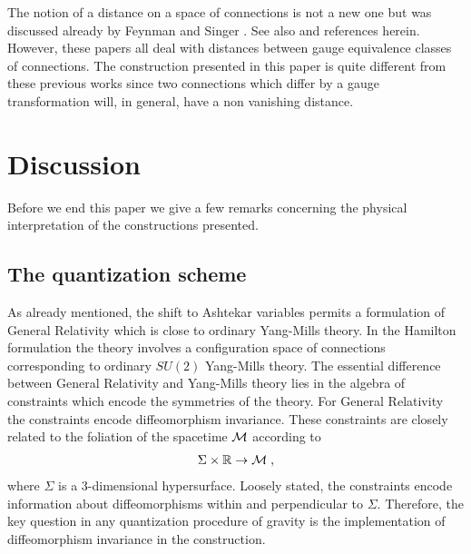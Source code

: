 \documentclass[12pt]{article}
\newcommand{\ba}{\begin{eqnarray}}
\newcommand{\ea}{\end{eqnarray}}
\def\cm{{\cal M}}
\begin{document}
The notion of a distance on a space of connections is not a new one but was discussed already by Feynman \cite{Feynman:1981ss} and Singer \cite{Singer:1981xw}. See also \cite{Orland:1996hm} and references herein. However, these papers all deal with distances between gauge equivalence classes of connections. The construction presented in this paper is quite different from these previous works since two connections which differ by a gauge transformation will, in general, have a non vanishing distance. 


















\section{Discussion}
\label{DISCu}




Before we end this paper we give a few remarks concerning the physical interpretation of the constructions presented. 










\subsection{The quantization scheme}
\label{link2}





 As already mentioned, the shift to Ashtekar variables permits a formulation of General Relativity which is close to ordinary Yang-Mills theory. In the Hamilton formulation the theory involves a configuration space of connections corresponding to ordinary $SU(2)$ Yang-Mills theory. The essential difference between General Relativity and Yang-Mills theory lies in the algebra of constraints which encode the symmetries of the theory. For General Relativity the constraints encode diffeomorphism invariance. These constraints are closely related to the foliation of the spacetime $\cm$ according to
\ba 
\Sigma\times \mathbb{R}\rightarrow \cm\;,
\label{foliation}
\ea
where $\Sigma$ is a 3-dimensional hypersurface. Loosely stated, the constraints encode information about diffeomorphisms within and perpendicular to $\Sigma$. Therefore, the key question in any quantization procedure of gravity is the implementation of diffeomorphism invariance in the construction.
\end{document}
